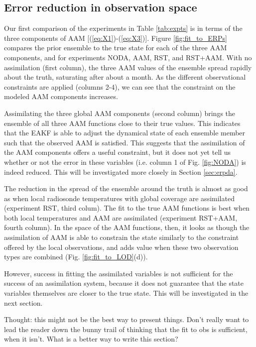 
\subsection{Error reduction in observation space}

Our first comparison of the experiments in Table \ref{tab:expts} is in terms of the three components of AAM [(\ref{eq:X1})-(\ref{eq:X3})].
Figure \ref{fig:fit_to_ERPs} compares the prior ensemble to the true state for each of the three AAM components, and for experiments NODA, AAM, RST, and RST+AAM.
With no assimilation (first column), the three AAM values of the ensemble spread rapidly about the truth, saturating after about a month.  
As the different observational constraints are applied (columns 2-4), we can see that the constraint on the modeled AAM components increases.

Assimilating the three global AAM components (second column) brings the ensemble of all three AAM functions close to their true values.
This indicates that the EAKF is able to adjust the dynamical state of each ensemble member such that the observed AAM is satisfied. 
This suggests that the assimilation of the AAM components offers a useful constraint, but  it does not yet tell us whether or not the error in these variables (i.e. column 1 of Fig. \ref{fig:NODA}) is indeed reduced.
This will be investigated more closely in Section \ref{sec:erpda}.


The reduction in the spread of the ensemble around the truth is almost as good as when local radiosonde temperatures with global coverage are assimilated (experiment RST, third colum).  
The fit to the true AAM functions is best when both local temperatures and AAM are assimilated (experiment RST+AAM, fourth column).
In the space of the AAM functions, then, it looks as though the assimilation of AAM is able to constrain the state similarly to the constraint offered by the local observations, and adds value when these two observation types are combined (Fig. \ref{fig:fit_to_LOD}(d)).

However, success in fitting the assimilated variables is not sufficient for the success of an assimilation system, because it does not guarantee that the state variables themselves are closer to the true state.  
This will be investigated in the next section.

\textcolor{alert}{Thought: this might not be the best way to present things. Don't really want to lead the reader down the bunny trail of thinking that the fit to obs is sufficient, when it isn't.  What is a better way to write this section?}

